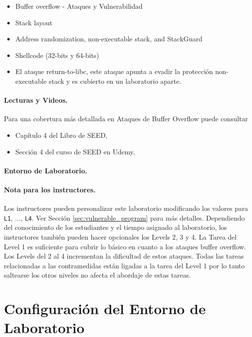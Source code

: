\begin{itemize}[noitemsep]
\item Buffer overflow - Ataques y Vulnerabilidad
\item Stack layout 
\item Address randomization, non-executable stack, and StackGuard
\item Shellcode (32-bits y 64-bits)
\item El ataque return-to-libc, este ataque apunta a evadir la protección non-executable stack y es cubierto en un laboratorio aparte.
\end{itemize}


\paragraph{Lecturas y Videos.}
Para una cobertura más detallada en Ataques de Buffer Overflow puede consultar

\begin{itemize}
\item Capítulo 4 del Libro de SEED, \seedbook
\item Sección 4 del curso de SEED en Udemy, \seedcsvideo
\end{itemize}


\paragraph{Entorno de Laboratorio.} 
\seedenvironmentC


\paragraph{Nota para los instructores.}
Los instructores pueden personalizar este laboratorio modificando los valores para \texttt{L1}, ..., \texttt{L4}. Ver Sección \ref{sec:vulnerable_program} para más detalles.
Dependiendo del conocimiento de los estudiantes y el tiempo asignado al laboratorio, los instructores también pueden hacer opcionales los Levels 2, 3 y 4.
La Tarea del Level 1 es suficiente para cubrir lo básico en cuanto a los ataques buffer overflow. Los Levels del 2 al 4 incrementan la dificultad de estos ataques.
Todas las tareas relacionadas a las contramedidas están ligadas a la tarea del Level 1 por lo tanto saltearse los otros niveles no afecta el abordaje de estas tareas.


\section{Configuración del Entorno de Laboratorio}

